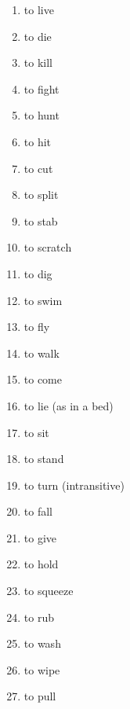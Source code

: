 \begin{multicols}{2}
\begin{enumerate}
\item   to live 

\item   to die 

\item   to kill 

\item   to fight 

\item   to hunt 

\item   to hit 

\item   to cut 

\item   to split 

\item   to stab 

\item   to scratch 

\item   to dig 

\item   to swim 

\item   to fly 

\item   to walk 

\item   to come 

\item   to lie (as in a bed) 

\item   to sit 

\item   to stand 

\item   to turn (intransitive) 

\item   to fall 

\item   to give 

\item   to hold 

\item   to squeeze 

\item   to rub 

\item   to wash 

\item   to wipe 

\item   to pull 


\end{enumerate}
\end{multicols}

